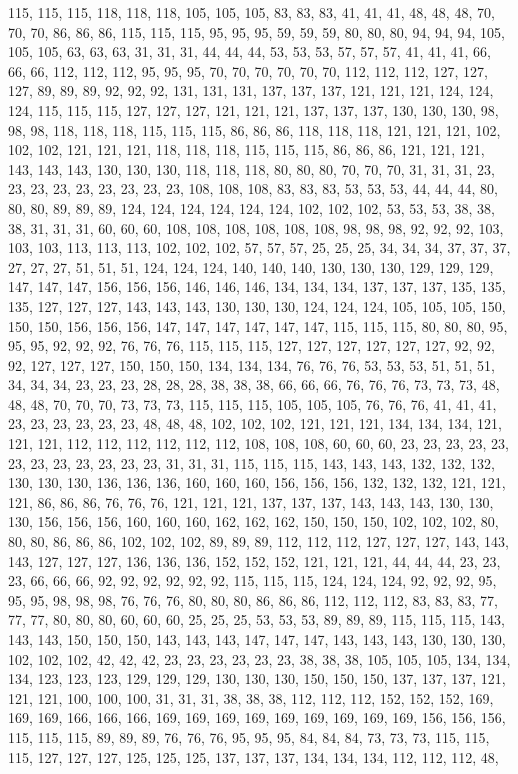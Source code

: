 115, 115, 115, 118, 118, 118, 105, 105, 105, 83, 83, 83, 41, 41, 41, 48, 48, 48, 70, 70, 70, 86, 86, 86, 115, 115, 115, 95, 95, 95, 59, 59, 59, 80, 80, 80, 94, 94, 94, 105, 105, 105, 63, 63, 63, 31, 31, 31, 44, 44, 44, 53, 53, 53, 57, 57, 57, 41, 41, 41, 66, 66, 66, 112, 112, 112, 95, 95, 95, 70, 70, 70, 70, 70, 70, 112, 112, 112, 127, 127, 127, 89, 89, 89, 92, 92, 92, 131, 131, 131, 137, 137, 137, 121, 121, 121, 124, 124, 124, 115, 115, 115, 127, 127, 127, 121, 121, 121, 137, 137, 137, 130, 130, 130, 98, 98, 98, 118, 118, 118, 115, 115, 115, 86, 86, 86, 118, 118, 118, 121, 121, 121, 102, 102, 102, 121, 121, 121, 118, 118, 118, 115, 115, 115, 86, 86, 86, 121, 121, 121, 143, 143, 143, 130, 130, 130, 118, 118, 118, 80, 80, 80, 70, 70, 70, 31, 31, 31, 23, 23, 23, 23, 23, 23, 23, 23, 23, 108, 108, 108, 83, 83, 83, 53, 53, 53, 44, 44, 44, 80, 80, 80, 89, 89, 89, 124, 124, 124, 124, 124, 124, 102, 102, 102, 53, 53, 53, 38, 38, 38, 31, 31, 31, 60, 60, 60, 108, 108, 108, 108, 108, 108, 98, 98, 98, 92, 92, 92, 103, 103, 103, 113, 113, 113, 102, 102, 102, 57, 57, 57, 25, 25, 25, 34, 34, 34, 37, 37, 37, 27, 27, 27, 51, 51, 51, 124, 124, 124, 140, 140, 140, 130, 130, 130, 129, 129, 129, 147, 147, 147, 156, 156, 156, 146, 146, 146, 134, 134, 134, 137, 137, 137, 135, 135, 135, 127, 127, 127, 143, 143, 143, 130, 130, 130, 124, 124, 124, 105, 105, 105, 150, 150, 150, 156, 156, 156, 147, 147, 147, 147, 147, 147, 115, 115, 115, 80, 80, 80, 95, 95, 95, 92, 92, 92, 76, 76, 76, 115, 115, 115, 127, 127, 127, 127, 127, 127, 92, 92, 92, 127, 127, 127, 150, 150, 150, 134, 134, 134, 76, 76, 76, 53, 53, 53, 51, 51, 51, 34, 34, 34, 23, 23, 23, 28, 28, 28, 38, 38, 38, 66, 66, 66, 76, 76, 76, 73, 73, 73, 48, 48, 48, 70, 70, 70, 73, 73, 73, 115, 115, 115, 105, 105, 105, 76, 76, 76, 41, 41, 41, 23, 23, 23, 23, 23, 23, 48, 48, 48, 102, 102, 102, 121, 121, 121, 134, 134, 134, 121, 121, 121, 112, 112, 112, 112, 112, 112, 108, 108, 108, 60, 60, 60, 23, 23, 23, 23, 23, 23, 23, 23, 23, 23, 23, 23, 31, 31, 31, 115, 115, 115, 143, 143, 143, 132, 132, 132, 130, 130, 130, 136, 136, 136, 160, 160, 160, 156, 156, 156, 132, 132, 132, 121, 121, 121, 86, 86, 86, 76, 76, 76, 121, 121, 121, 137, 137, 137, 143, 143, 143, 130, 130, 130, 156, 156, 156, 160, 160, 160, 162, 162, 162, 150, 150, 150, 102, 102, 102, 80, 80, 80, 86, 86, 86, 102, 102, 102, 89, 89, 89, 112, 112, 112, 127, 127, 127, 143, 143, 143, 127, 127, 127, 136, 136, 136, 152, 152, 152, 121, 121, 121, 44, 44, 44, 23, 23, 23, 66, 66, 66, 92, 92, 92, 92, 92, 92, 115, 115, 115, 124, 124, 124, 92, 92, 92, 95, 95, 95, 98, 98, 98, 76, 76, 76, 80, 80, 80, 86, 86, 86, 112, 112, 112, 83, 83, 83, 77, 77, 77, 80, 80, 80, 60, 60, 60, 25, 25, 25, 53, 53, 53, 89, 89, 89, 115, 115, 115, 143, 143, 143, 150, 150, 150, 143, 143, 143, 147, 147, 147, 143, 143, 143, 130, 130, 130, 102, 102, 102, 42, 42, 42, 23, 23, 23, 23, 23, 23, 38, 38, 38, 105, 105, 105, 134, 134, 134, 123, 123, 123, 129, 129, 129, 130, 130, 130, 150, 150, 150, 137, 137, 137, 121, 121, 121, 100, 100, 100, 31, 31, 31, 38, 38, 38, 112, 112, 112, 152, 152, 152, 169, 169, 169, 166, 166, 166, 169, 169, 169, 169, 169, 169, 169, 169, 169, 156, 156, 156, 115, 115, 115, 89, 89, 89, 76, 76, 76, 95, 95, 95, 84, 84, 84, 73, 73, 73, 115, 115, 115, 127, 127, 127, 125, 125, 125, 137, 137, 137, 134, 134, 134, 112, 112, 112, 48, 